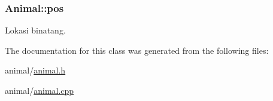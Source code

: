 \subsubsection[{\texorpdfstring{pos}{pos}}]{ Animal\+::pos\hspace{0.3cm}{\ttfamily [protected]}}\hypertarget{classAnimal_ae4e9a6fe53c7ebfbb00536f0e38de5c8}{}\label{classAnimal_ae4e9a6fe53c7ebfbb00536f0e38de5c8}


Lokasi binatang. 



The documentation for this class was generated from the following files\+:\begin{DoxyCompactItemize}
\item 
animal/\hyperlink{animal_8h}{animal.\+h}\item 
animal/\hyperlink{animal_8cpp}{animal.\+cpp}\end{DoxyCompactItemize}
